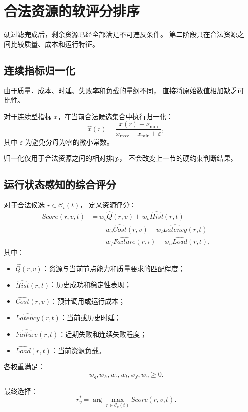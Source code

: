 \documentclass[UTF8,a4paper,12pt,oneside]{ctexbook}
\begin{document}
\section{合法资源的软评分排序}

硬过滤完成后，剩余资源已经全部满足不可违反条件。
第二阶段只在合法资源之间比较质量、成本和运行特征。

\subsection{连续指标归一化}

由于质量、成本、时延、失败率和负载的量纲不同，
直接将原始数值相加缺乏可比性。

对于连续型指标 $x$，在当前合法候选集合中执行归一化：
\[
\hat{x}(r)
=
\frac{x(r)-x_{\min}}
{x_{\max}-x_{\min}+\varepsilon},
\]
其中 $\varepsilon$ 为避免分母为零的微小常数。

归一化仅用于合法资源之间的相对排序，
不会改变上一节的硬约束判断结果。


\subsection{运行状态感知的综合评分}

对于合法候选 $r\in\mathcal{C}_v(t)$，
定义资源评分：
\[
\begin{aligned}
Score(r,v,t)
&= w_q\hat{Q}(r,v) + w_h\hat{Hist}(r,t) \\[3pt]
&\quad {}- w_c\hat{Cost}(r,v) - w_l\hat{Latency}(r,t) \\[3pt]
&\quad {}- w_f\hat{Failure}(r,t) - w_u\hat{Load}(r,t),
\end{aligned}
\]
其中：

\begin{itemize}
    \item $\hat{Q}(r,v)$：资源与当前节点能力和质量要求的匹配程度；
    \item $\hat{Hist}(r,t)$：历史成功和稳定性表现；
    \item $\hat{Cost}(r,v)$：预计调用或运行成本；
    \item $\hat{Latency}(r,t)$：当前或历史时延；
    \item $\hat{Failure}(r,t)$：近期失败和连续失败程度；
    \item $\hat{Load}(r,t)$：当前资源负载。
\end{itemize}

各权重满足：
\[
w_q,w_h,w_c,w_l,w_f,w_u\geq0.
\]

最终选择：
\[
r_v^{*}
=
\arg\max_{r\in\mathcal{C}_v(t)}
Score(r,v,t).
\]
\end{document}
